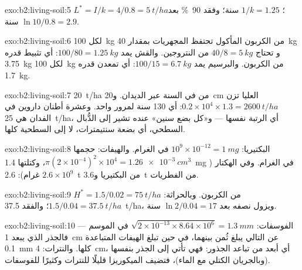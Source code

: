 \begin{solution}{exo:b2:living-soil:5}
$L^{*} = I/k = 4/0.8 = \qty{5}{t/ha}$؛  $1/k = 1.25$
سنة؛ وفقد \qty{90}{\%} بعد $\ln 10/0.8 = 2.9$ سنة.
\end{solution}

\begin{solution}{exo:b2:living-soil:6}
لكل \qty{100}{kg} من الكربون المأكول تحتفظ المجهريات بمقدار \qty{40}{kg} و
تحتاج $40/8 = \qty{5}{kg}$ من النتروجين. والقش يمد $100/80 =
\qty{1.25}{kg}$: أي تثبيط قدره \qty{3.75}{kg} لكل \qty{100}{kg}
من الكربون. والبرسيم يمد $100/15 = \qty{6.7}{kg}$: أي تمعدن
قدره \qty{1.7}{kg}.
\end{solution}

\begin{solution}{exo:b2:living-soil:7}
\qty{20}{t/ha} من  في السنة عبر الديدان. و\qty{20}{cm}
العليا تزن $0.2\times 10^{4}\times 1.3 = \qty{2600}{t/ha}$:
أي 130 سنة لمرور واحد. وعشرة أطنان داروين في الفدان هي
\qty{25}{t/ha}، أي الرتبة نفسها --- و«كل بضع سنين» عنده تشير
إلى الدُّبال السطحي، أي بضعة سنتيمترات، لا إلى  السطحية كلها.
\end{solution}

\begin{solution}{exo:b2:living-soil:8}
البكتيريا: $10^{9}\times 10^{-12} = \qty{1}{mg}$ في الغرام. والهيفات:
حجمها $\pi(2\times 10^{-4})^{2}\times 10^{4} = \qty{1.26e-3}{cm^3}$،
وكتلتها \qty{1.4}{mg} في الغرام. وفي الهكتار ($2.6\times 10^{9}$ غرام):
\qty{2.6}{t} من البكتيريا و\qty{3.6}{t} من الفطريات.
\end{solution}

\begin{solution}{exo:b2:living-soil:9}
$H^{*} = 1.5/0.02 = \qty{75}{t/ha}$ من الكربون. وبالحراثة: $1.5/0.04
= \qty{37.5}{t/ha}$؛ والفقد \qty{37.5}{t/ha}، ويزول نصفه بعد
$\ln 2/0.04 = 17$ سنة.
\end{solution}

\begin{solution}{exo:b2:living-soil:10}
الفوسفات: $\sqrt{2\times 10^{-13}\times 8.64\times 10^{6}} =
\qty{1.3}{mm}$ في الموسم --- فالجذر الذي يبعد \qty{1}{cm} عن التالي
يبلغ ثُمن  بينهما، في حين تبلغ الهيفات المتباعدة
\qty{0.1}{mm} كلها. والنترات: \qty{4}{cm}، أي أبعد
من تباعد الجذور: فهي تأتي إلى الجذر بنفسها (وبالجريان
الكتلي مع الماء)، فتضيف الميكوريزا قليلًا للنترات
وكثيرًا للفوسفات.
\end{solution}

